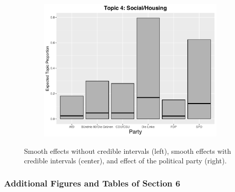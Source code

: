 \begin{figure}[h!]
\begin{subfigure}[b]{0.3\linewidth}
    \includegraphics[width=\linewidth]{../plots/appendix/5_1/direct_t4_cat.pdf}
  \end{subfigure}
  \caption{Smooth effects without credible intervals (left), smooth effects with credible intervals (center), and effect of the political party (right).}
  \label{fig:coffee}
\end{figure}

\vfill
\clearpage

\subsubsection*{Additional Figures and Tables of Section 6}

